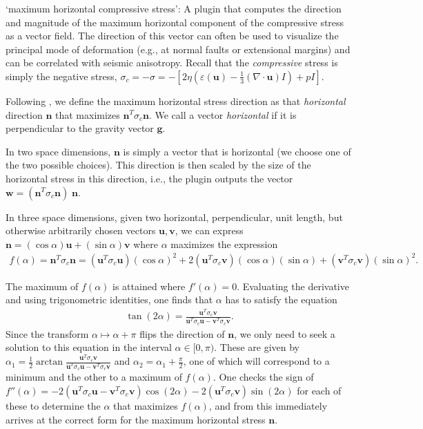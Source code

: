\begin{itemize}
`maximum horizontal compressive stress': A plugin that computes the direction and magnitude of the maximum horizontal component of the compressive stress as a vector field. The direction of this vector can often be used to visualize the principal mode of deformation (e.g., at normal faults or extensional margins) and can be correlated with seismic anisotropy. Recall that the \textit{compressive} stress is simply the negative stress, $\sigma_c=-\sigma=-\left[     2\eta (\varepsilon(\mathbf u)             - \frac 13 (\nabla \cdot \mathbf u) I)     + pI\right]$.

Following \cite{LundTownend07}, we define the maximum horizontal stress direction as that \textit{horizontal} direction $\mathbf n$ that maximizes $\mathbf n^T \sigma_c \mathbf n$. We call a vector \textit{horizontal} if it is perpendicular to the gravity vector $\mathbf g$.

In two space dimensions, $\mathbf n$ is simply a vector that is horizontal (we choose one of the two possible choices). This direction is then scaled by the size of the horizontal stress in this direction, i.e., the plugin outputs the vector $\mathbf w = (\mathbf n^T \sigma_c \mathbf n) \; \mathbf n$.

In three space dimensions, given two horizontal, perpendicular, unit length, but otherwise arbitrarily chosen vectors $\mathbf u,\mathbf v$, we can express $\mathbf n = (\cos \alpha)\mathbf u + (\sin\alpha)\mathbf v$ where $\alpha$ maximizes the expression \begin{align*}  f(\alpha) = \mathbf n^T \sigma_c \mathbf n  = (\mathbf u^T \sigma_c \mathbf u)(\cos\alpha)^2    +2(\mathbf u^T \sigma_c \mathbf v)(\cos\alpha)(\sin\alpha)    +(\mathbf v^T \sigma_c \mathbf v)(\sin\alpha)^2.\end{align*}

The maximum of $f(\alpha)$ is attained where $f'(\alpha)=0$. Evaluating the derivative and using trigonometric identities, one finds that $\alpha$ has to satisfy the equation \begin{align*}  \tan(2\alpha) = \frac{\mathbf u^T \sigma_c \mathbf v}                          {\mathbf u^T \sigma_c \mathbf u                            - \mathbf v^T \sigma_c \mathbf v}.\end{align*}Since the transform $\alpha\mapsto\alpha+\pi$ flips the direction of $\mathbf n$, we only need to seek a solution to this equation in the interval $\alpha\in[0,\pi)$. These are given by $\alpha_1=\frac 12 \arctan \frac{\mathbf u^T \sigma_c \mathbf v}{\mathbf u^T \sigma_c \mathbf u - \mathbf v^T \sigma_c \mathbf v}$ and $\alpha_2=\alpha_1+\frac{\pi}{2}$, one of which will correspond to a minimum and the other to a maximum of $f(\alpha)$. One checks the sign of $f''(\alpha)=-2(\mathbf u^T \sigma_c \mathbf u - \mathbf v^T \sigma_c \mathbf v)\cos(2\alpha) - 2 (\mathbf u^T \sigma_c \mathbf v) \sin(2\alpha)$ for each of these to determine the $\alpha$ that maximizes $f(\alpha)$, and from this immediately arrives at the correct form for the maximum horizontal stress $\mathbf n$.


\end{itemize}
